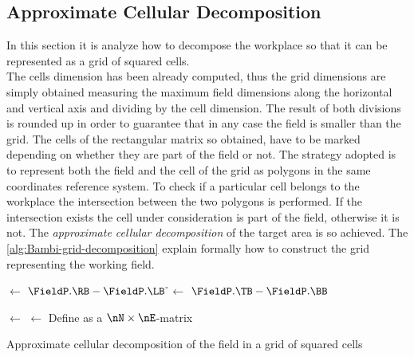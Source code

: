 \subsection{Approximate Cellular Decomposition} %
\label{sub:approximate_cellular_decomposition}
In this section it is analyze how to decompose the workplace so that it can be represented as a grid of squared cells.\\
The cells dimension has been already computed, thus the grid dimensions are simply obtained measuring the maximum field dimensions along the horizontal and vertical axis and dividing by the cell dimension. The result of both divisions is rounded up in order to guarantee that in any case the field is smaller than the grid. The cells of the rectangular matrix so obtained, have to be marked depending on whether they are part of the field or not. The strategy adopted is to represent both the field and the cell of the grid as polygons in the same coordinates reference system. To check if a particular cell belongs to the workplace the intersection between the two polygons is performed. If the intersection exists the cell under consideration is part of the field, otherwise it is not. The \textit{approximate cellular decomposition} of the target area is so achieved. The \autoref{alg:Bambi-grid-decomposition} explain formally how to construct the grid representing the working field.
\begin{algorithm}[tbh]
	
	\BlankLine
	
	\w $\leftarrow$ $\FieldP.\RB - \FieldP.\LB$ \;
	\h $\leftarrow$ $\FieldP.\TB - \FieldP.\BB$ \;

	\nE $\leftarrow$ \Ceil{$\w / \l$} \;
	\nN $\leftarrow$ \Ceil{$\h / \l$} \;
	Define \Matrix as a $\nN\times\nE$-matrix\;
\caption{Approximate cellular decomposition of the field in a grid of squared cells}
\label{alg:Bambi-grid-decomposition}
\end{algorithm}
